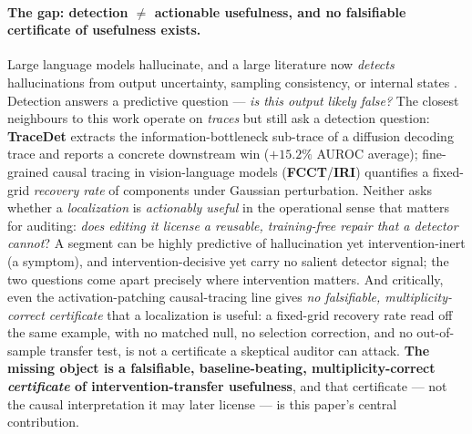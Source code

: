 \documentclass[11pt]{article}
\theoremstyle{plain}
\theoremstyle{definition}
\begin{document}
\paragraph{The gap: detection $\ne$ actionable usefulness, and no falsifiable
certificate of usefulness exists.} Large language models hallucinate, and a large
literature now \emph{detects} hallucinations from output uncertainty, sampling
consistency, or internal states
\cite{farquhar2024semantic,manakul2023selfcheckgpt,chen2024inside,ji2023survey}.
Detection answers a predictive question --- \emph{is this output likely false?}
The closest neighbours to this work operate on \emph{traces} but still ask a
detection question: \textbf{TraceDet} \cite{tracedet2026diffusion} extracts the
information-bottleneck sub-trace of a diffusion decoding trace and reports a
concrete downstream win ($+15.2\%$ AUROC average); fine-grained causal tracing in
vision-language models (\textbf{FCCT}/\textbf{IRI}) \cite{li2026fcct} quantifies a
fixed-grid \emph{recovery rate} of components under Gaussian perturbation. Neither
asks whether a \emph{localization} is \emph{actionably useful} in the operational
sense that matters for auditing: \emph{does editing it license a reusable,
training-free repair that a detector cannot}? A segment can be highly predictive of
hallucination yet intervention-inert (a symptom), and intervention-decisive yet
carry no salient detector signal; the two questions come apart precisely where
intervention matters. And critically, even the activation-patching causal-tracing
line gives \emph{no falsifiable, multiplicity-correct certificate} that a
localization is useful: a fixed-grid recovery rate read off the same example, with
no matched null, no selection correction, and no out-of-sample transfer test, is
not a certificate a skeptical auditor can attack. \textbf{The missing object is a
falsifiable, baseline-beating, multiplicity-correct \emph{certificate} of
intervention-transfer usefulness}, and that certificate --- not the causal
interpretation it may later license --- is this paper's central contribution.
\end{document}
